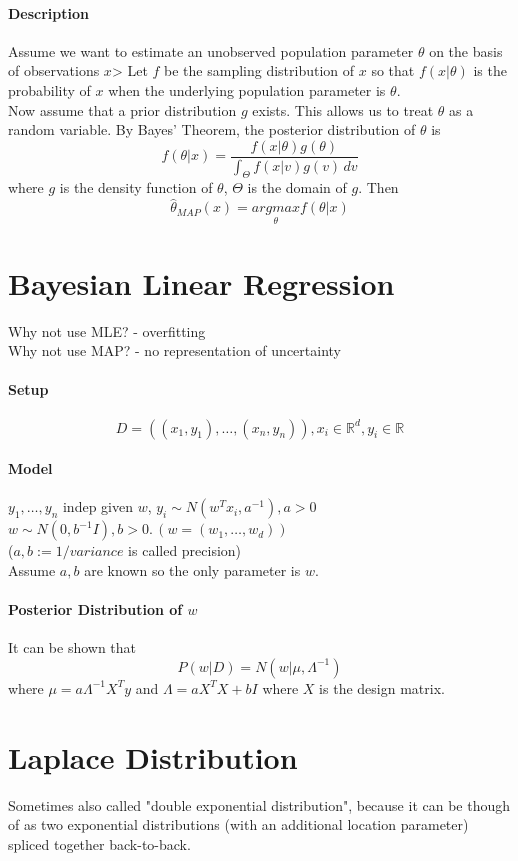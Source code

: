 \documentclass[11pt]{article}
\newcommand{\real}[0]{\mathbb{R}}
\begin{document}
\paragraph{Description}
Assume we want to estimate an unobserved population parameter $\theta$ on the basis of observations $x$> Let $f$ be the sampling distribution of $x$ so that $f(x|\theta)$ is the probability of $x$ when the underlying population parameter is $\theta$. \\
Now assume that a prior distribution $g$ exists. This allows us to treat $\theta$ as a random variable. By Bayes' Theorem, the posterior distribution of $\theta$ is 
$$f(\theta|x) = \frac{f(x|\theta)g(\theta)}{\int_\Theta f(x|v)g(v)\,dv}$$
where $g$ is the density function of $\theta$, $\Theta$ is the domain of $g$.
Then
$$\hat{\theta}_{MAP}(x) = \underset{\theta}{argmax} f(\theta|x)$$
\section{Bayesian Linear Regression}
Why not use MLE? - overfitting \\
Why not use MAP? - no representation of uncertainty
\paragraph{Setup}
$$D = ((x_1, y_1), \hdots, (x_n, y_n)), x_i \in \real^d, y_i \in \real$$
\paragraph{Model}
$y_1, \hdots, y_n$ indep given $w$, $y_i \sim N(w^Tx_i, a^{-1}), a>0$ \\
$w \sim N(0,b^{-1}I), b>0. \, (w=(w_1,\hdots,w_d))$ \\
($a, b:= 1/ variance$ is called precision) \\
Assume $a,b$ are known so the only parameter is $w$.
\paragraph{Posterior Distribution of $w$}
It can be shown that $$P(w|D) = N(w|\mu, \Lambda^{-1})$$
where $\mu = a\Lambda^{-1}X^Ty$ and $\Lambda = aX^TX+bI$ where $X$ is the design matrix.
\section{Laplace Distribution}
Sometimes also called "double exponential distribution", because it can be though of as two exponential distributions (with an additional location parameter) spliced together back-to-back.
\end{document}
